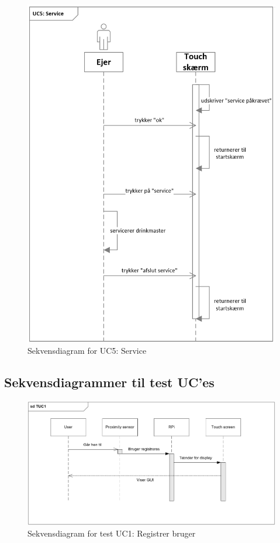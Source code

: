 \begin{figure}[H]
	\centering
	\includegraphics[width=1\textwidth]{Images/UC5service.png}
	\caption{Sekvensdiagram for UC5: Service}
	\label{fig:UC2_service}
\end{figure}

\subsection{Sekvensdiagrammer til test UC'es}

\begin{figure}[H]
	\centering
	\includegraphics[width=1\textwidth]{Images/TUC1.png}
	\caption{Sekvensdiagram for test UC1: Registrer bruger}
	\label{fig:testUC1}
\end{figure}

